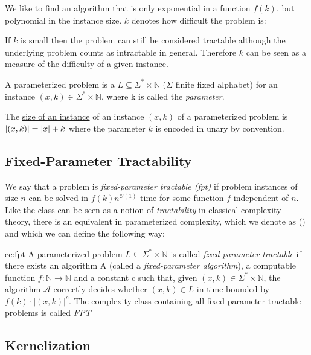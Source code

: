 We like to find an algorithm that is only exponential in a function $f(k)$, but polynomial in the instance size.
$k$ denotes how difficult the problem is: 

If $k$ is small then the problem can still be considered tractable although the underlying \NPh problem counts as intractable in general.
Therefore $k$ can be seen as a measure of the difficulty of a given instance.


\begin{definition}
    A parameterized problem is a $L\subseteq\Sigma^*\times \mathbb{N}$ ($\Sigma$ finite fixed alphabet) for an instance $(x,k)\in \Sigma^*\times \mathbb{N}$, where k is called the \textit{parameter}.

    The \underline{size of an instance} of an instance $(x,k)$ of a parameterized problem is $\abs{(x,k)} = \abs{x} + k$ where the parameter $k$ is encoded in unary by convention.
\end{definition}

\subsection{Fixed-Parameter Tractability}
We say that a problem is \textit{fixed-parameter tractable (fpt)} if problem instances of size $n$ can be solved in $f(k)n^{\mathcal{O}(1)}$ time for some function $f$ independent of $n$. 
Like the class \Pt can be seen as a notion of \textit{tractability} in classical complexity theory, there is an equivalent in parameterized complexity, which we denote as \FPTl (\FPT) and which we can define the following way:

\begin{cc} {cc:fpt}
    A parameterized problem $L\subseteq\Sigma^*\times\mathbb{N}$ is called \textit{fixed-parameter tractable} if there exists an algorithm A (called a \textit{fixed-parameter algorithm}), a computable function $f:\mathbb{N} \rightarrow \mathbb{N}$ and a constant c such that, given $(x,k) \in \Sigma^* \times \mathbb{N}$, the algorithm $\mathcal{A}$ correctly decides whether $(x,k) \in L$ in time bounded by $f(k) \cdot |(x,k)|^c$. The complexity class containing all fixed-parameter tractable problems is called \textit{FPT}
\end{cc}
\subsection{Kernelization}

